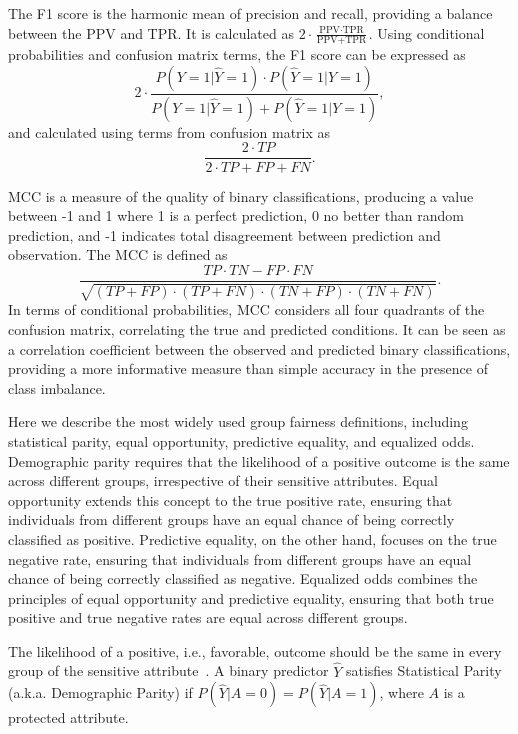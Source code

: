 \begin{definition}[F1 Score]\label{def:f1}
The F1 score is the harmonic mean of precision and recall, providing a balance between the PPV and TPR. It is calculated as $2 \cdot \frac{\text{PPV} \cdot \text{TPR}}{\text{PPV} + \text{TPR}}$. Using conditional probabilities and confusion matrix terms, the F1 score can be expressed as $$2 \cdot \frac{P(Y=1|\hat{Y}=1) \cdot P(\hat{Y}=1|Y=1)}{P(Y=1|\hat{Y}=1) + P(\hat{Y}=1|Y=1)},$$ and calculated using terms from confusion matrix as $$\frac{2 \cdot TP}{2 \cdot TP + FP + FN}.$$
\end{definition}

\begin{definition}\label{def:mcc}
MCC is a measure of the quality of binary classifications, producing a value between -1 and 1 where 1 is a perfect prediction, 0 no better than random prediction, and -1 indicates total disagreement between prediction and observation. The MCC is defined as $$\frac{TP \cdot TN - FP \cdot FN}{\sqrt{(TP+FP) \cdot (TP+FN) \cdot (TN+FP) \cdot (TN+FN)}}.$$ In terms of conditional probabilities, MCC considers all four quadrants of the confusion matrix, correlating the true and predicted conditions. It can be seen as a correlation coefficient between the observed and predicted binary classifications, providing a more informative measure than simple accuracy in the presence of class imbalance.
\end{definition}
    
Here we describe the most widely used group fairness definitions, including statistical parity, equal opportunity, predictive equality, and equalized odds. Demographic parity requires that the likelihood of a positive outcome is the same across different groups, irrespective of their sensitive attributes. Equal opportunity extends this concept to the true positive rate, ensuring that individuals from different groups have an equal chance of being correctly classified as positive. Predictive equality, on the other hand, focuses on the true negative rate, ensuring that individuals from different groups have an equal chance of being correctly classified as negative. Equalized odds combines the principles of equal opportunity and predictive equality, ensuring that both true positive and true negative rates are equal across different groups.

\begin{definition}\label{def:demo_parity}
The likelihood of a positive, i.e., favorable, outcome should be the same in every group of the sensitive attribute~\citep{Dwork2011,Kusner2018}. A binary predictor $\hat{Y}$ satisfies Statistical Parity (a.k.a. Demographic Parity) if $P(\hat{Y}|A=0) = P(\hat{Y}|A=1)$, where $A$ is a protected attribute.
\end{definition}

